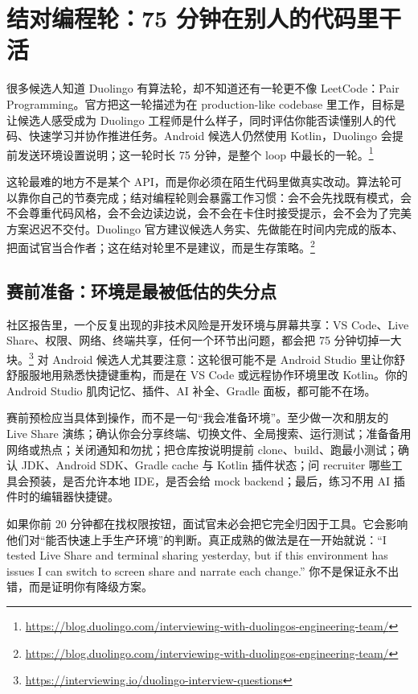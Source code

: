\chapter{结对编程轮：75 分钟在别人的代码里干活}

很多候选人知道 Duolingo 有算法轮，却不知道还有一轮更不像 LeetCode：Pair Programming。官方把这一轮描述为在 production-like codebase 里工作，目标是让候选人感受成为 Duolingo 工程师是什么样子，同时评估你能否读懂别人的代码、快速学习并协作推进任务。Android 候选人仍然使用 Kotlin，Duolingo 会提前发送环境设置说明；这一轮时长 75 分钟，是整个 loop 中最长的一轮。\srcofficial\footnote{\url{https://blog.duolingo.com/interviewing-with-duolingos-engineering-team/}}

这轮最难的地方不是某个 API，而是你必须在陌生代码里做真实改动。算法轮可以靠你自己的节奏完成；结对编程轮则会暴露工作习惯：会不会先找既有模式，会不会尊重代码风格，会不会边读边说，会不会在卡住时接受提示，会不会为了完美方案迟迟不交付。Duolingo 官方建议候选人务实、先做能在时间内完成的版本、把面试官当合作者；这在结对轮里不是建议，而是生存策略。\srcofficial\footnote{\url{https://blog.duolingo.com/interviewing-with-duolingos-engineering-team/}}

\section{赛前准备：环境是最被低估的失分点}

社区报告里，一个反复出现的非技术风险是开发环境与屏幕共享：VS Code、Live Share、权限、网络、终端共享，任何一个环节出问题，都会把 75 分钟切掉一大块。\srccommunity\footnote{\url{https://interviewing.io/duolingo-interview-questions}} 对 Android 候选人尤其要注意：这轮很可能不是 Android Studio 里让你舒舒服服地用熟悉快捷键重构，而是在 VS Code 或远程协作环境里改 Kotlin。你的 Android Studio 肌肉记忆、插件、AI 补全、Gradle 面板，都可能不在场。

赛前预检应当具体到操作，而不是一句“我会准备环境”。至少做一次和朋友的 Live Share 演练；确认你会分享终端、切换文件、全局搜索、运行测试；准备备用网络或热点；关闭通知和勿扰；把仓库按说明提前 clone、build、跑最小测试；确认 JDK、Android SDK、Gradle cache 与 Kotlin 插件状态；问 recruiter 哪些工具会预装，是否允许本地 IDE，是否会给 mock backend；最后，练习不用 AI 插件时的编辑器快捷键。

\begin{pitfall}[环境失败会被误读成协作失败]
如果你前 20 分钟都在找权限按钮，面试官未必会把它完全归因于工具。它会影响他们对“能否快速上手生产环境”的判断。真正成熟的做法是在一开始就说：“I tested Live Share and terminal sharing yesterday, but if this environment has issues I can switch to screen share and narrate each change.” 你不是保证永不出错，而是证明你有降级方案。
\end{pitfall}

